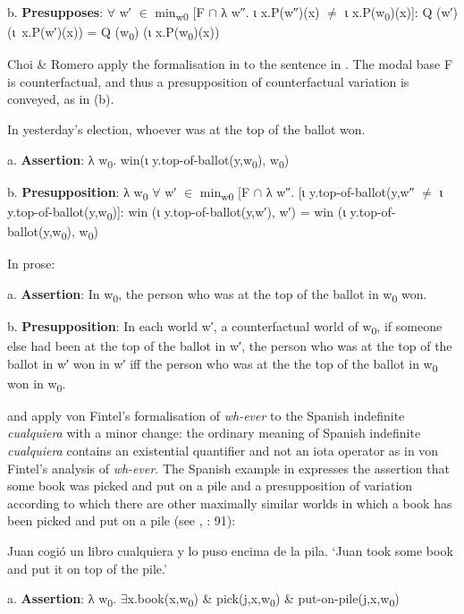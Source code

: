   b.  \textbf{Presupposes}: ${\forall}$ w′ ${\in}$ min\textsubscript{w0} [F ${\cap}$ λ w″. ι x.P(w″)(x) ${\neq}$ ι x.P(w\textsubscript{0})(x)]: Q (w′) (ι~x.P(w′)(x)) = Q (w\textsubscript{0}) (ι x.P(w\textsubscript{0})(x))

Choi \& Romero apply the formalisation\textstyleannotationreference{} in  to the sentence in . The modal base F is counterfactual, and thus a presupposition of counterfactual variation is conveyed, as in (b).

\label{bkm:Ref150779072}  In yesterday’s election, whoever was at the top of the ballot won.

  a.  \textbf{Assertion}: λ w\textsubscript{0}. win(ι y.top-of-ballot(y,w\textsubscript{0}), w\textsubscript{0})

  b.  \textbf{Presupposition}: λ w\textsubscript{0} ${\forall}$ w′ ${\in}$ min\textsubscript{w0} [F ${\cap}$ λ w″. [ι y.top-of-ballot(y,w″ ${\neq}$ ι y.top-of-ballot(y,w\textsubscript{0})]: win (ι y.top-of-ballot(y,w′), w′) = win (ι y.top-of-ballot(y,w\textsubscript{0}), w\textsubscript{0})

In prose:

  a.  \textbf{Assertion}: In w\textsubscript{0}, the person who was at the top of the ballot in w\textsubscript{0} won.

  b.  \textbf{Presupposition}: In each world w′, a counterfactual world of w\textsubscript{0}, if someone else had been at the top of the ballot in w′, the person who was at the top of the ballot in w′ won in w′ iff the person who was at the the top of the ballot in w\textsubscript{0} won in w\textsubscript{0}.

\citet{Choi2007} and \citet{ChoiRomero2008} apply von Fintel’s formalisation of \textit{wh-ever} to the Spanish indefinite \textit{cualquiera} with a minor change: the ordinary meaning of Spanish indefinite \textit{cualquiera} contains an existential quantifier and not an iota operator as in von Fintel’s analysis of \textit{wh-ever}. The Spanish example in  expresses the assertion that some book was picked and put on a pile and a presupposition of variation according to which there are other maximally similar worlds in which a book has been picked and put on a pile (see \citealt{Choi2007}, \citealt{ChoiRomero2008}: 91):

\label{bkm:Ref517736}  Juan cogió un libro cualquiera y lo puso encima de la pila. ‘Juan took some book and put it on top of the pile.’ 

  a.  \textbf{Assertion}: λ w\textsubscript{0}. ${\exists}$x.book(x,w\textsubscript{0}) \& pick(j,x,w\textsubscript{0}) \& put-on-pile(j,x,w\textsubscript{0})

